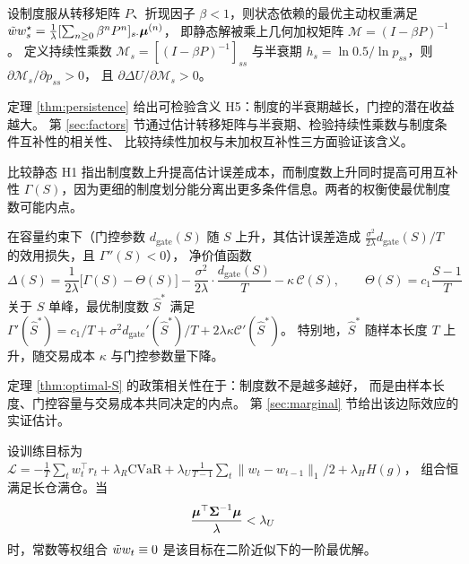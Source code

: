 \begin{theorem}[持续性乘数]
\label{thm:persistence}
设制度服从转移矩阵 $P$、折现因子 $\beta<1$，则状态依赖的最优主动权重满足
$\tilde{w} w^\star_s=\frac1\lambda[\sum_{n\ge0}\beta^nP^n]_{s\cdot}\boldsymbol{\mu}^{(n)}$，
即静态解被乘上几何加权矩阵 $\mathcal{M}=(I-\beta P)^{-1}$。
定义持续性乘数 $\mathcal{M}_s=[(I-\beta P)^{-1}]_{ss}$ 与半衰期
$h_s=\ln0.5/\ln p_{ss}$，则 $\partial\mathcal{M}_s/\partial p_{ss}>0$，
且 $\partial\Delta U/\partial\mathcal{M}_s>0$。
\end{theorem}

定理 \ref{thm:persistence} 给出可检验含义 H5：制度的半衰期越长，门控的潜在收益越大。
第 \ref{sec:factors} 节通过估计转移矩阵与半衰期、检验持续性乘数与制度条件互补性的相关性、
比较持续性加权与未加权互补性三方面验证该含义。

比较静态 H1 指出制度数上升提高估计误差成本，而制度数上升同时提高可用互补性
$\Gamma(S)$，因为更细的制度划分能分离出更多条件信息。两者的权衡使最优制度数可能内点。

\begin{theorem}[最优制度数]
\label{thm:optimal-S}
在容量约束下（门控参数 $d_{\text{gate}}(S)$ 随 $S$ 上升，其估计误差造成
$\frac{\sigma^2}{2\lambda}d_{\text{gate}}(S)/T$ 的效用损失，且 $\Gamma''(S)<0$），
净价值函数
\begin{equation}
\Delta(S)=\frac{1}{2\lambda}\Big[\Gamma(S)-\Theta(S)\Big]
-\frac{\sigma^2}{2\lambda}\cdot\frac{d_{\text{gate}}(S)}{T}
-\kappa\,\mathcal{C}(S),
\qquad \Theta(S)=c_1\frac{S-1}{T}
\label{eq:delta-S}
\end{equation}
关于 $S$ 单峰，最优制度数 $\hat S^\ast$ 满足
$\Gamma'(\hat S^\ast)=c_1/T+\sigma^2d_{\text{gate}}'(\hat S^\ast)/T+2\lambda\kappa\mathcal{C}'(\hat S^\ast)$。
特别地，$\hat S^\ast$ 随样本长度 $T$ 上升，随交易成本 $\kappa$ 与门控参数量下降。
\end{theorem}

定理 \ref{thm:optimal-S} 的政策相关性在于：制度数不是越多越好，
而是由样本长度、门控容量与交易成本共同决定的内点。
第 \ref{sec:marginal} 节给出该边际效应的实证估计。

\begin{proposition}[退化命题]
\label{prop:degeneracy}
设训练目标为
$\mathcal{L}=-\frac1T\sum_t w_t^\top r_t+\lambda_R\mathrm{CVaR}
+\lambda_U\frac1{T-1}\sum_t\|w_t-w_{t-1}\|_1/2+\lambda_HH(g)$，
组合恒满足长仓满仓。当
\begin{equation}
\frac{\boldsymbol{\mu}^\top\boldsymbol{\Sigma}^{-1}\boldsymbol{\mu}}{\lambda}<\lambda_U
\label{eq:degeneracy-cond}
\end{equation}
时，常数等权组合 $\tilde{w} w_t\equiv0$ 是该目标在二阶近似下的一阶最优解。
\end{proposition}

